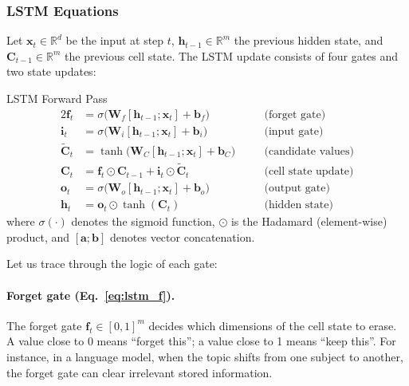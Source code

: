 \documentclass[11pt,a4paper]{article}
\begin{document}
\subsubsection{LSTM Equations}

Let $\mathbf{x}_t \in \mathbb{R}^d$ be the input at step $t$, $\mathbf{h}_{t-1} \in \mathbb{R}^m$ the previous hidden state, and $\mathbf{C}_{t-1} \in \mathbb{R}^m$ the previous cell state. The LSTM update consists of four gates and two state updates:

\begin{defbox}{LSTM Forward Pass}
\begin{alignat}{2}
  \mathbf{f}_t &= \sigma\!\bigl(\mathbf{W}_f[\mathbf{h}_{t-1};\mathbf{x}_t] + \mathbf{b}_f\bigr)
    &&\quad\text{(forget gate)} \label{eq:lstm_f}\\[3pt]
  \mathbf{i}_t &= \sigma\!\bigl(\mathbf{W}_i[\mathbf{h}_{t-1};\mathbf{x}_t] + \mathbf{b}_i\bigr)
    &&\quad\text{(input gate)} \label{eq:lstm_i}\\[3pt]
  \tilde{\mathbf{C}}_t &= \tanh\!\bigl(\mathbf{W}_C[\mathbf{h}_{t-1};\mathbf{x}_t] + \mathbf{b}_C\bigr)
    &&\quad\text{(candidate values)} \label{eq:lstm_ctilde}\\[3pt]
  \mathbf{C}_t &= \mathbf{f}_t \odot \mathbf{C}_{t-1} + \mathbf{i}_t \odot \tilde{\mathbf{C}}_t
    &&\quad\text{(cell state update)} \label{eq:lstm_C}\\[3pt]
  \mathbf{o}_t &= \sigma\!\bigl(\mathbf{W}_o[\mathbf{h}_{t-1};\mathbf{x}_t] + \mathbf{b}_o\bigr)
    &&\quad\text{(output gate)} \label{eq:lstm_o}\\[3pt]
  \mathbf{h}_t &= \mathbf{o}_t \odot \tanh(\mathbf{C}_t)
    &&\quad\text{(hidden state)} \label{eq:lstm_h}
\end{alignat}
where $\sigma(\cdot)$ denotes the sigmoid function, $\odot$ is the Hadamard (element-wise) product, and $[\mathbf{a};\mathbf{b}]$ denotes vector concatenation.
\end{defbox}

Let us trace through the logic of each gate:

\paragraph{Forget gate (Eq.~\ref{eq:lstm_f}).} The forget gate $\mathbf{f}_t \in [0,1]^m$ decides which dimensions of the cell state to erase. A value close to 0 means ``forget this''; a value close to 1 means ``keep this''. For instance, in a language model, when the topic shifts from one subject to another, the forget gate can clear irrelevant stored information.
\end{document}
